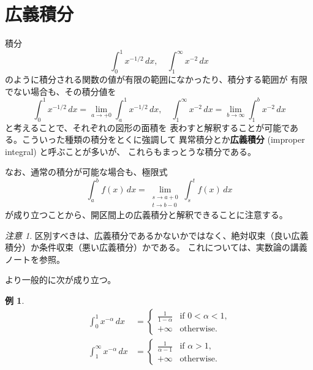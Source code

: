 \documentclass[a4paper]{jsarticle}
\theoremstyle{definition}
\newtheorem{Example}[Theorem]{例}
\newtheorem{Exercise}{問}%
\theoremstyle{remark}
\newtheorem{Remark}{注意}
\begin{document}


\bigskip
\bigskip
\section{広義積分}
\par
\medskip
積分
\[
\int_0^1 x^{-1/2}\,dx,\quad \int_1^\infty x^{-2}\,dx
\]
のように積分される関数の値が有限の範囲になかったり、積分する範囲が
有限でない場合も、その積分値を
\[
  \int_0^1 x^{-1/2}\,dx = \lim_{a \to +0} \int_a^1 x^{-1/2}\, dx,\quad
  \int_1^\infty x^{-2}\,dx = \lim_{b \to \infty} \int_1^b x^{-2}\, dx 
\]
と考えることで、それぞれの図形の面積を
表わすと解釈することが可能である。こういった種類の積分をとくに強調して
異常積分とか\textbf{広義積分} (improper integral) と呼ぶことが多いが、%
これらもまっとうな積分である。

なお、通常の積分が可能な場合も、極限式
\[
  \int_a^b f(x)\, dx = \lim_{\substack{s \to a+0\\ t \to b-0}} \int_s^t f(x)\, dx
\]
が成り立つことから、開区間上の広義積分と解釈できることに注意する。



\begin{Remark}
{\small 
区別すべきは、広義積分であるかないかではなく、絶対収束（良い広義積分）か条件収束（悪い広義積分）かである。
これについては、実数論の講義ノートを参照。
}
\end{Remark}

より一般的に次が成り立つ。

\begin{Example}
\begin{align*}
\int_0^1 x^{-\alpha}\,dx &=
\begin{cases} \frac{1}{1-\alpha} &\text{if $0 < \alpha < 1$,}\\
+\infty &\text{otherwise.}
\end{cases}\\
\int_1^\infty x^{-\alpha}\,dx &=
\begin{cases} \frac{1}{\alpha -1} &\text{if $\alpha>1$,}\\
+\infty &\text{otherwise.}
\end{cases}
\end{align*}
\end{Example}
\end{document}
